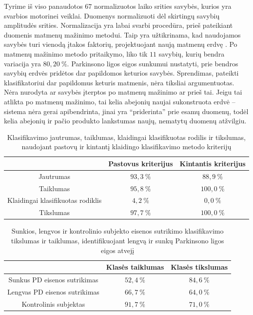 \documentclass[]{vgtuef}
\begin{document}
Tyrime iš viso panaudotos $67$ normalizuotos laiko srities savybės, kurios yra svarbios motorinei veiklai. Duomenys normalizuoti dėl skirtingų savybių amplitudės srities. Normalizacija yra labai svarbi procedūra, prieš pateikiant duomenis matmenų mažinimo metodui. Taip yra užtikrinama, kad naudojamos savybės turi vienodą įtakos faktorių, projektuojant naują matmenų erdvę \cite{824819}. Po matmenų mažinimo metodo pritaikymo, liko tik $11$ savybių, kurių bendra variacija yra $80,20~\%$. Parkinsono ligos eigos sunkumui nustatyti, prie bendros savybių erdvės pridėtos dar papildomos keturios savybės. Sprendimas, pateikti klasifikatoriui dar papildomus keturis matmenis, nėra tiksliai argumentuotas. Nėra nurodyta ar savybės įterptos po matmenų mažinimo ar prieš tai. Jeigu tai atlikta po matmenų mažinimo, tai kelia abejonių naujai sukonstruota erdvė -- sistema nėra gerai apibendrinta, jinai yra ``priderinta'' prie esamų duomenų, todėl kelia abejonių ir pačio produkto lankstumas naujų, nematytų duomenų atžvilgiu. 

\begin{table}
	\centering
  \renewcommand{\arraystretch}{1.3}
	\caption{Klasifikavimo jautrumas, taiklumas, klaidingai klasifikuotas rodilis ir tikslumas, naudojant pastovų ir kintantį klaidingo klasifikavimo metodo kriterijų \cite{5627904}}
	\label{table:wireless_svm_pd_recognition}
	\begin{tabular}{|c|c|c|} \hline
		& Pastovus kriterijus & Kintantis kriterijus \\ \hline
	Jautrumas & $93,3~\%$ & $88,9~\%$ \\ \hline
	Taiklumas & $95,8~\%$ & $100,0~\%$ \\ \hline
	Klaidingai klasifikuotas rodiklis & $4,2~\%$ & $0,0~\%$ \\ \hline
	Tikslumas & $97,7~\%$ & $100,0~\%$ \\ \hline
	\end{tabular}
\end{table}

\begin{table}
	\centering
	\renewcommand{\arraystretch}{1.3}
	\caption{Sunkios, lengvos ir kontrolinio subjekto eisenos sutrikimo klasifikavimo tikslumas ir taiklumas, identifikuojant lengvą ir sunkų Parkinsono ligos eigos atvejį \cite{5627904}}
	\label{table:wireless_svm_recognition}
	\begin{tabular}{|c|c|c|} \hline
		& Klasės taiklumas & Klasės tikslumas \\ \hline
	Sunkus PD eisenos sutrikimas & $52,4~\%$ & $84,6~\%$ \\ \hline
	Lengvas PD eisenos sutrikimas & $66,7~\%$ & $64,0~\%$ \\ \hline
	Kontrolinis subjektas & $91,7~\%$ & $71,0~\%$ \\ \hline
	\end{tabular}
\end{table}
\end{document}

